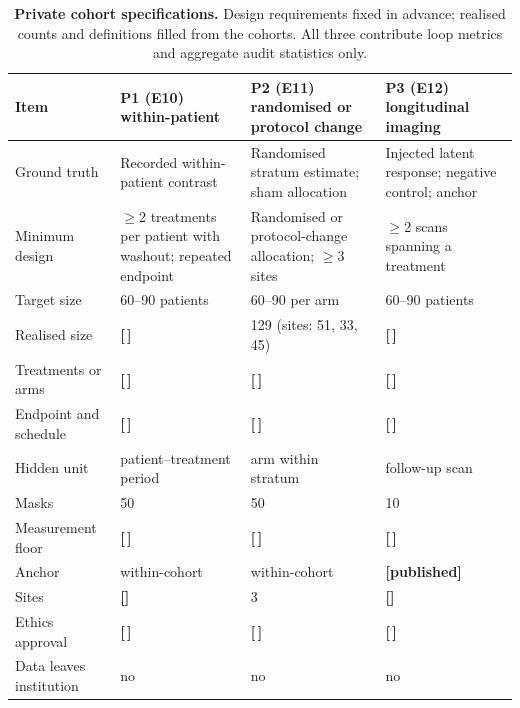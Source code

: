 \documentclass[11pt,a4paper]{article}
\newcommand{\tbd}[1]{{\color{red}\textbf{[#1]}}}
\newcommand{\T}{{\color{red}\textbf{[\,]}}}
\begin{document}
\begin{table}[!htbp]\centering\footnotesize
\caption{\textbf{Private cohort specifications.} Design requirements fixed in advance; realised counts and definitions filled from the cohorts. All three contribute loop metrics and aggregate audit statistics only.}
\label{tab:s33}
\begin{tabularx}{\textwidth}{@{}p{3.2cm} Y Y Y@{}}\toprule
Item & P1 (E10) within-patient & P2 (E11) randomised or protocol change & P3 (E12) longitudinal imaging\\\midrule
Ground truth & Recorded within-patient contrast & Randomised stratum estimate; sham allocation & Injected latent response; negative control; anchor\\
Minimum design & $\ge$2 treatments per patient with washout; repeated endpoint & Randomised or protocol-change allocation; $\ge$3 sites & $\ge$2 scans spanning a treatment\\
Target size & 60--90 patients & 60--90 per arm & 60--90 patients\\
Realised size & \T & 129 (sites: 51, 33, 45) & \T\\
Treatments or arms & \T & \T & \T\\
Endpoint and schedule & \T & \T & \T\\
Hidden unit & patient--treatment period & arm within stratum & follow-up scan\\
Masks & 50 & 50 & 10\\
Measurement floor & \T & \T & \T\\
Anchor & within-cohort & within-cohort & \tbd{published}\\
Sites & \tbd{} & 3 & \tbd{}\\
Ethics approval & \T & \T & \T\\
Data leaves institution & no & no & no\\
\bottomrule\end{tabularx}
\end{table}
\FloatBarrier
\end{document}
